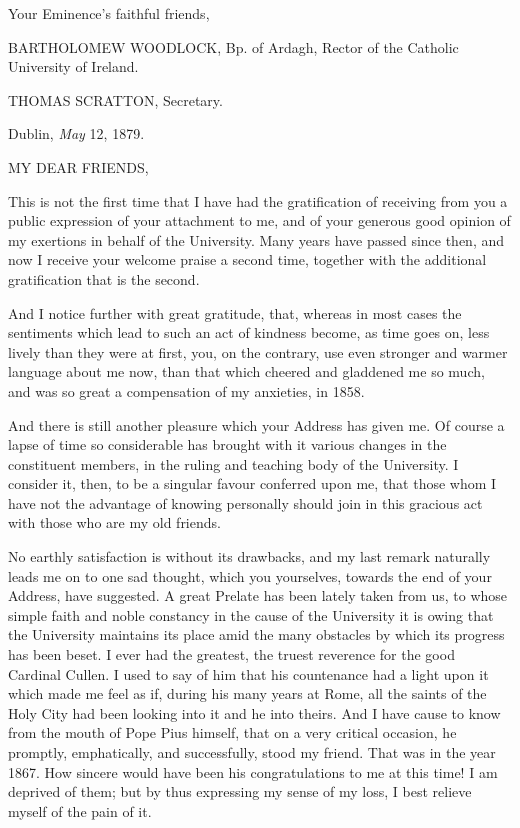 Your Eminence's faithful friends,

BARTHOLOMEW WOODLOCK, Bp.
of Ardagh, Rector of the Catholic University of Ireland.

THOMAS SCRATTON,
Secretary.

Dublin, \emph{May} 12, 1879.


MY DEAR FRIENDS,

This is not the first time that I have had the gratification of
receiving from you a public expression of your attachment to me, and
of your generous good opinion of my exertions in behalf of the
University. Many years have passed since then, and now I receive your
welcome praise a second time, together with the additional
gratification that is the second.

And I notice further with great gratitude, that, whereas in most
cases the sentiments which lead to such an act of kindness become, as
time goes on, less lively than they were at first, you, on the
contrary, use even stronger and warmer language about me now,
than that which cheered and gladdened me so much, and was so great a
compensation of my anxieties, in 1858.

And there is still another pleasure which your Address has given
me. Of course a lapse of time so considerable has brought with it
various changes in the constituent members, in the ruling and teaching
body of the University. I consider it, then, to be a singular favour
conferred upon me, that those whom I have not the advantage of knowing
personally should join in this gracious act with those who are my old
friends.

No earthly satisfaction is without its drawbacks, and my last
remark naturally leads me on to one sad thought, which you yourselves,
towards the end of your Address, have suggested. A great Prelate has
been lately taken from us, to whose simple faith and noble constancy
in the cause of the University it is owing that the University
maintains its place amid the many obstacles by which its progress has
been beset. I ever had the greatest, the truest reverence for the good
Cardinal Cullen. I used to say of him that his countenance had a light upon it which made me feel as if, during his many years at Rome,
all the saints of the Holy City had been looking into it and he into
theirs. And I have cause to know from the mouth of Pope Pius himself,
that on a very critical occasion, he promptly, emphatically, and
successfully, stood my friend. That was in the year 1867. How sincere
would have been his congratulations to me at this time! I am deprived
of them; but by thus expressing my sense of my loss, I best relieve
myself of the pain of it.

